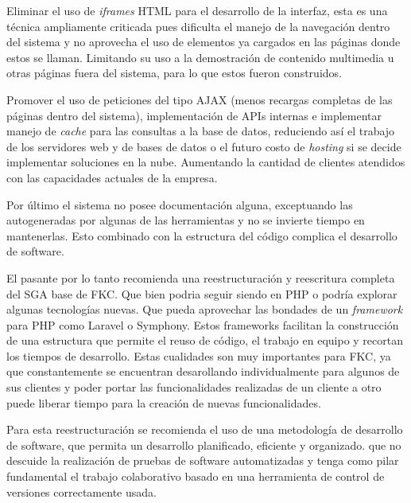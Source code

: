 Eliminar el uso de \emph{iframes} HTML para el desarrollo de la interfaz, esta es una técnica ampliamente criticada pues dificulta el manejo de la navegación dentro del sistema y no aprovecha el uso de elementos ya cargados en las páginas donde estos se llaman. Limitando su uso a la demostración de contenido multimedia u otras páginas fuera del sistema, para lo que estos fueron construidos.

Promover el uso de peticiones del tipo AJAX (menos recargas completas de las páginas dentro del sistema), implementación de APIs internas e implementar manejo de \emph{cache} para las consultas a la base de datos, reduciendo así el trabajo de los servidores web y de bases de datos o el futuro costo de \emph{hosting} si se decide implementar soluciones en la nube. Aumentando la cantidad de clientes atendidos con las capacidades actuales de la empresa.

Por último el sistema no posee documentación alguna, exceptuando las autogeneradas por algunas de las herramientas y no se invierte tiempo en mantenerlas. Esto combinado con la estructura del código complica el desarrollo de software.

El pasante por lo tanto recomienda una reestructuración y reescritura completa del SGA base de FKC. Que bien podria seguir siendo en PHP o podría explorar algunas tecnologías nuevas. Que pueda aprovechar las bondades de un \emph{framework} para PHP como Laravel o Symphony. Estos frameworks facilitan la construcción de una estructura que permite el reuso de código, el trabajo en equipo y recortan los tiempos de desarrollo. Estas cualidades son muy importantes para FKC, ya que constantemente se encuentran desarollando individualmente para algunos de sus clientes y poder portar las funcionalidades realizadas de un cliente a otro puede liberar tiempo para la creación de nuevas funcionalidades.

Para esta reestructuración se recomienda el uso de una metodología de desarrollo de software, que permita un desarrollo planificado, eficiente y organizado. que no descuide la realización de pruebas de software automatizadas y tenga como pilar fundamental el trabajo colaborativo basado en una herramienta de control de versiones correctamente usada.


